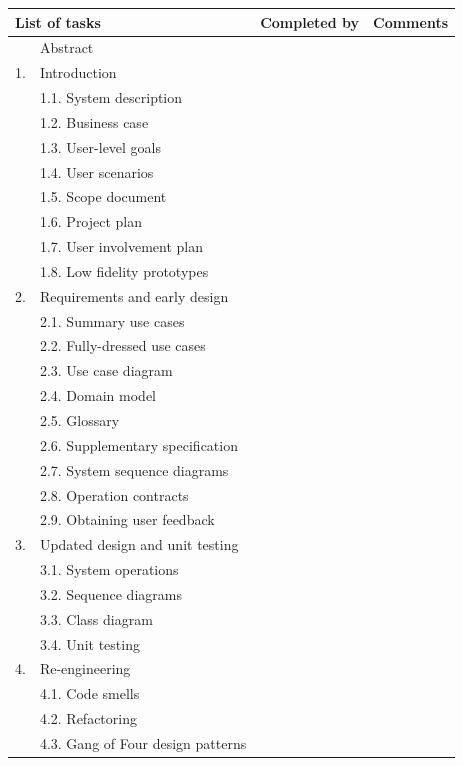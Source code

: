 \documentclass[12pt,a4paper]{article}
\begin{document}
\begin{longtable}{| p{0.2cm} p{6.25cm} | p{3cm}| p{5cm} |}
  \hline
  \multicolumn{2}{|l|}{\textbf{List of tasks}} & \textbf{Completed by} & \textbf{Comments} \\ \hline
   & Abstract &  &  \\ \hline
  1. & Introduction &  &  \\ \hline
   & 1.1. System description &  &  \\ \hline
   & 1.2. Business case &  &  \\ \hline
   & 1.3. User-level goals &  &  \\ \hline
   & 1.4. User scenarios &  &  \\ \hline
   & 1.5. Scope document &  &  \\ \hline
   & 1.6. Project plan &  &  \\ \hline
   & 1.7. User involvement plan &  &  \\ \hline
   & 1.8. Low fidelity prototypes &  &  \\ \hline
  2. & Requirements and early design &  &  \\ \hline
   & 2.1. Summary use cases &  &  \\ \hline
   & 2.2. Fully-dressed use cases &  &  \\ \hline
   & 2.3. Use case diagram &  &  \\ \hline
   & 2.4. Domain model &  &  \\ \hline
   & 2.5. Glossary &  &  \\ \hline
   & 2.6. Supplementary specification &  &  \\ \hline
   & 2.7. System sequence diagrams &  &  \\ \hline
   & 2.8. Operation contracts &  &  \\ \hline
   & 2.9. Obtaining user feedback &  &  \\ \hline
  3. & Updated design and unit testing &  &  \\ \hline
   & 3.1. System operations &  &  \\ \hline
   & 3.2. Sequence diagrams &  &  \\ \hline
   & 3.3. Class diagram &  &  \\ \hline
   & 3.4. Unit testing &  &  \\ \hline
  4. & Re-engineering &  &  \\ \hline
   & 4.1. Code smells &  &  \\ \hline
   & 4.2. Refactoring &  &  \\ \hline
   & 4.3. Gang of Four design patterns &  &  \\ \hline

\end{longtable}
\end{document}
